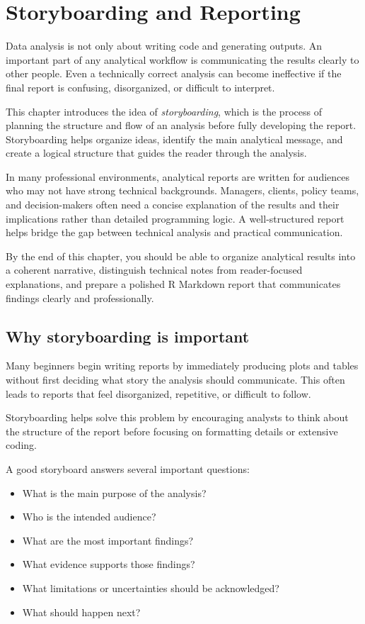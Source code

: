 \documentclass[
  11pt,
  oneside]{book}
\providecommand{\tightlist}{%
  \setlength{\itemsep}{0pt}\setlength{\parskip}{0pt}}
\begin{document}
\chapter{Storyboarding and Reporting}\label{storyboarding-and-reporting}

Data analysis is not only about writing code and generating outputs. An important part of any analytical workflow is communicating the results clearly to other people. Even a technically correct analysis can become ineffective if the final report is confusing, disorganized, or difficult to interpret.

This chapter introduces the idea of \emph{storyboarding}, which is the process of planning the structure and flow of an analysis before fully developing the report. Storyboarding helps organize ideas, identify the main analytical message, and create a logical structure that guides the reader through the analysis.

In many professional environments, analytical reports are written for audiences who may not have strong technical backgrounds. Managers, clients, policy teams, and decision-makers often need a concise explanation of the results and their implications rather than detailed programming logic. A well-structured report helps bridge the gap between technical analysis and practical communication.

By the end of this chapter, you should be able to organize analytical results into a coherent narrative, distinguish technical notes from reader-focused explanations, and prepare a polished R Markdown report that communicates findings clearly and professionally.

\section{Why storyboarding is important}\label{why-storyboarding-is-important}

Many beginners begin writing reports by immediately producing plots and tables without first deciding what story the analysis should communicate. This often leads to reports that feel disorganized, repetitive, or difficult to follow.

Storyboarding helps solve this problem by encouraging analysts to think about the structure of the report before focusing on formatting details or extensive coding.

A good storyboard answers several important questions:

\begin{itemize}
\tightlist
\item
  What is the main purpose of the analysis?
\item
  Who is the intended audience?
\item
  What are the most important findings?
\item
  What evidence supports those findings?
\item
  What limitations or uncertainties should be acknowledged?
\item
  What should happen next?
\end{itemize}
\end{document}
